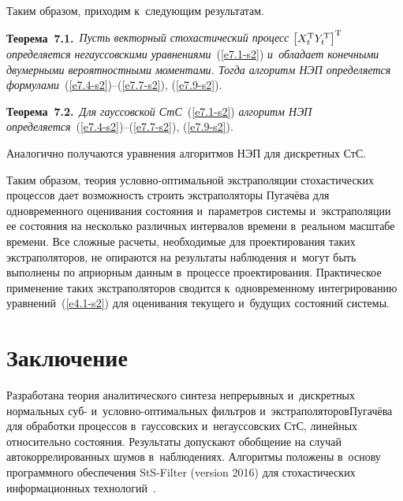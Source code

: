 \begin{multicols}{2}
Таким образом, приходим к~следующим результатам.

\pagebreak


\noindent
\textbf{Теорема~7.1.}\
\textit{Пусть векторный стохастический процесс  
$\left[ X_t^{\mathrm{T}} Y_t^{\mathrm{T}}\right]^{\mathrm{T}}$ определяется 
негауссовскими уравнениями}~(\ref{e7.1-s2}) \textit{и~обладает 
конечными  двумерными вероятностными моментами. Тогда алгоритм НЭП определяется 
формулами}~(\ref{e7.4-s2})--(\ref{e7.7-s2}), (\ref{e7.9-s2}).

\smallskip

\noindent
\textbf{Теорема~7.2.}\ \textit{Для гауссовской СтС}~(\ref{e7.1-s2}) 
\textit{алгоритм НЭП определяется}~(\ref{e7.4-s2})--(\ref{e7.7-s2}), (\ref{e7.9-s2}).

\smallskip


Аналогично получаются уравнения алгоритмов НЭП для дискретных СтС.

Таким образом, теория условно-оптимальной экстраполяции стохастических процессов дает
возможность строить экстраполяторы Пугачёва для одновременного
оценивания состояния и~параметров системы и~экстраполяции ее
состояния на несколько различных интервалов времени в~реальном
масштабе времени. Все сложные расчеты, необходимые для
проектирования таких экстраполяторов, не опираются на результаты
наблюдения и~могут быть выполнены по априорным данным в~процессе
проектирования. Практическое применение таких экстраполяторов
сводится к~одновременному интегрированию уравнений~(\ref{e4.1-s2}) 
для оценивания текущего и~будущих состояний системы.


\section{Заключение}

Разработана теория аналитического синтеза непрерывных и~дискретных нормальных 
суб- и~услов\-но-оп\-ти\-маль\-ных фильтров и~экстраполяторов\linebreak Пугачёва для обработки 
процессов в~гауссовских и~негаус\-совских СтС, линейных относительно 
состояния.  Результаты допускают обобщение на случай автокоррелированных шумов 
в~наблюдениях. Алгоритмы положены в~основу программного обеспечения StS-Filter  
(version 2016) для стохастических информационных технологий~\cite{7-s2}.


{\small\frenchspacing
 {%
 \begin{thebibliography}{9}




\end{thebibliography}}}
\end{multicols}
